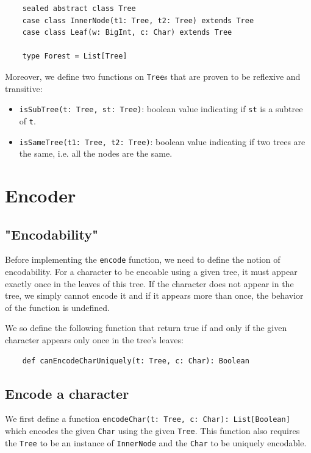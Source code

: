 \documentclass[a4paper,UKenglish,cleveref, autoref, thm-restate]{lipics-v2021}
\begin{document}
\begin{lstlisting}
    sealed abstract class Tree
    case class InnerNode(t1: Tree, t2: Tree) extends Tree
    case class Leaf(w: BigInt, c: Char) extends Tree
  
    type Forest = List[Tree]
\end{lstlisting}

Moreover, we define two functions on \lstinline{Tree}s that are proven to be reflexive and transitive:
\begin{itemize}
    \item \lstinline{isSubTree(t: Tree, st: Tree)}: boolean value indicating if \lstinline{st} is a subtree of \lstinline{t}.
    \item \lstinline{isSameTree(t1: Tree, t2: Tree)}: boolean value indicating if two trees are the same, i.e. all the nodes are the same.
\end{itemize}

\section{Encoder}

\subsection{"Encodability"}
Before implementing the \lstinline{encode} function, we need to define the notion of encodability. For a character to be encoable using a given tree, it must appear exactly once in the leaves of this tree. If the character does 
not appear in the tree, we simply cannot encode it and if it appears more than once, the behavior of the function is undefined.

We so define the following function that return true if and only if the given character appears only once in the tree's leaves:

\begin{lstlisting}
    def canEncodeCharUniquely(t: Tree, c: Char): Boolean
\end{lstlisting}


\subsection{Encode a character}
We first define a function \lstinline{encodeChar(t: Tree, c: Char): List[Boolean]} which encodes the given \lstinline{Char} using the given \lstinline{Tree}. This function also requires the \lstinline{Tree} to be an instance of \lstinline{InnerNode} 
and the \lstinline{Char} to be uniquely encodable.
\end{document}
